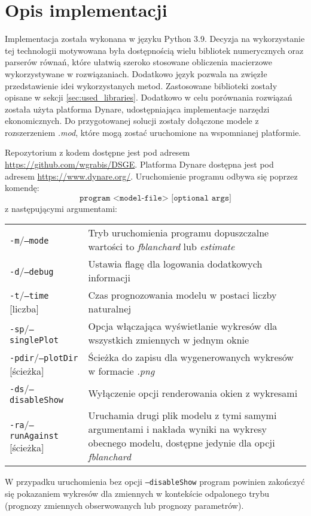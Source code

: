 \section{Opis implementacji}
\label{sec:implementation_result}

Implementacja została wykonana w języku Python 3.9. Decyzja na wykorzystanie tej technologii motywowana była dostępnością wielu bibliotek numerycznych oraz parserów równań, które ułatwią szeroko stosowane obliczenia macierzowe wykorzystywane w rozwiązaniach. Dodatkowo język pozwala na zwięzłe przedstawienie idei wykorzystanych metod. Zastosowane biblioteki zostały opisane w sekcji \ref{sec:used_libraries}. Dodatkowo w celu porównania rozwiązań została użyta platforma Dynare, udostępniająca implementacje narzędzi ekonomicznych. Do przygotowanej solucji zostały dołączone modele z rozszerzeniem \emph{.mod}, które mogą zostać uruchomione na wspomnianej platformie. 

Repozytorium z kodem dostępne jest pod adresem \url{https://github.com/wgrabis/DSGE}. Platforma Dynare dostępna jest pod adresem \url{https://www.dynare.org/}. Uruchomienie programu odbywa się poprzez komendę:
\begin{equation}
    \texttt{program <model-file> [optional args]} \nonumber
\end{equation}
z następującymi argumentami:
\begin{center}
    \begin{tabular}{p{}p{}}
          \texttt{-m}/\texttt{--mode} & Tryb uruchomienia programu dopuszczalne wartości to \emph{fblanchard} lub \emph{estimate} \\
         \texttt{-d}/\texttt{--debug} & Ustawia flagę dla logowania dodatkowych informacji\\
         \texttt{-t}/\texttt{--time} [liczba] & Czas prognozowania modelu w postaci liczby naturalnej \\
         \texttt{-sp}/\texttt{--singlePlot} & Opcja włączająca wyświetlanie wykresów dla wszystkich zmiennych w jednym oknie \\
         \texttt{-pdir}/\texttt{--plotDir} [ścieżka] & Ścieżka do zapisu dla wygenerowanych wykresów w formacie \emph{.png} \\
         \texttt{-ds}/\texttt{--disableShow}  & Wyłączenie opcji renderowania okien z wykresami \\
         \texttt{-ra}/\texttt{--runAgainst} [ścieżka]  & Uruchamia drugi plik modelu z tymi samymi argumentami i nakłada wyniki na wykresy obecnego modelu, dostępne jedynie dla opcji \emph{fblanchard}  \\
    \end{tabular}
\end{center}
W przypadku uruchomienia bez opcji \texttt{--disableShow} program powinien zakończyć się pokazaniem wykresów dla zmiennych w kontekście odpalonego trybu (prognozy zmiennych obserwowanych lub prognozy parametrów).

